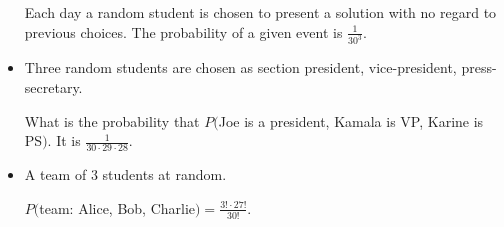 \documentclass{report}
\begin{document}
\begin{examples}
\begin{example}
\begin{itemize}
                Each day a random student is chosen to present a solution with no regard to previous choices. The probability of a given event is $\frac{1}{30^{3}}$.

                \item Three random students are chosen as section president, vice-president, press-secretary.

                What is the probability that $P($Joe is a president, Kamala is VP, Karine is PS$)$. It is $\frac{1}{30 \cdot 29 \cdot 28}$.

                \item A team of $3$ students at random.

                $P($team: Alice, Bob, Charlie$) = \frac{3! \cdot 27!}{30!}$. 
            \end{itemize}
    \end{example}
\end{examples}
\end{document}
